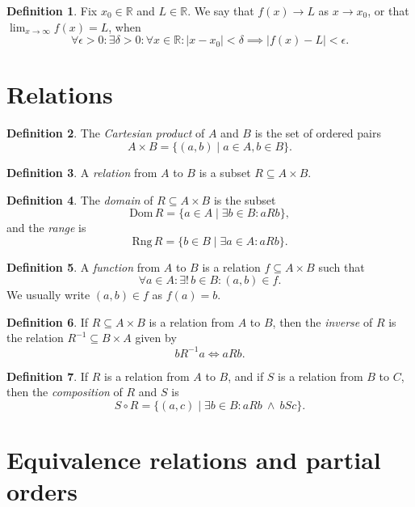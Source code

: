 \documentclass{article}
\theoremstyle{definition}
\newtheorem{definition}{Definition}
\renewcommand{\subset}{\subseteq}
\newcommand{\R}{\mathbb{R}}
\begin{document}
\begin{definition}
	Fix $x_0\in\R$ and $L\in\R$. We say that $f(x)\to L$ as $x\to x_0$, or that $\displaystyle\lim_{x\to\infty}f(x)=L$, when
	\[
		\forall\epsilon>0 : \exists \delta>0 : \forall x\in\R : |x-x_0|<\delta \implies |f(x)-L|<\epsilon.
	\]
\end{definition}


\section*{Relations}

\begin{definition}
	The \emph{Cartesian product} of $A$ and $B$ is the set of ordered pairs
	\[
		A\times B = \{(a,b)\mid a\in A, b\in B\}.
	\]
\end{definition}

\begin{definition}
	A \emph{relation} from $A$ to $B$ is a subset $R\subset A\times B$.
\end{definition}

\begin{definition}
	The \emph{domain} of $R\subset A\times B$ is the subset
	\[
		\mathrm{Dom}\, R = \{a\in A \mid \exists b\in B : aRb\},
	\]
	and the \emph{range} is
	\[
		\mathrm{Rng}\, R = \{b\in B \mid \exists a\in A : aRb\}.
	\]
\end{definition}

\begin{definition}
	A \emph{function} from $A$ to $B$ is a relation $f\subset A\times B$ such that
	\[
		\forall a\in A : \exists!\, b\in B : (a,b)\in f.
	\]
	We usually write $(a,b)\in f$ as $f(a)=b$.
\end{definition}

\begin{definition}
	If $R\subset A\times B$ is a relation from $A$ to $B$, then the \emph{inverse} of $R$ is the relation $R^{-1}\subset B\times A$ given by
	\[
		bR^{-1}a \iff aRb.
	\]
\end{definition}

\begin{definition}
	If $R$ is a relation from $A$ to $B$, and if $S$ is a relation from $B$ to $C$, then the \emph{composition} of $R$ and $S$ is
	\[
		S\circ R = \{(a,c) \mid \exists b\in B : aRb \:\wedge\: bSc\}.
	\]
\end{definition}


\section*{Equivalence relations and partial orders}
\end{document}
